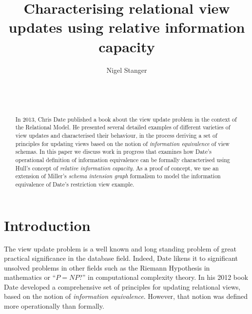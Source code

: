 \documentclass{sig-alternate-05-2015}
\begin{document}

\title{Characterising relational view updates using relative information capacity}

\author{
\alignauthor Nigel Stanger \\
    \\
    \\
    \\
}

\maketitle




\begin{abstract}
In 2013, Chris Date published a book about the view update problem in the context of the Relational Model. He presented several detailed examples of different varieties of view updates and characterised their behaviour, in the process deriving a set of principles for updating views based on the notion of \emph{information equivalence} of view schemas. In this paper we discuss work in progress that examines how Date's operational definition of information equivalence can be formally characterised using Hull's concept of \emph{relative information capacity}. As a proof of concept, we use an extension of Miller's \emph{schema intension graph} formalism to model the information equivalence of Date's restriction view example.
\end{abstract}




\section{Introduction}

\noindent The view update problem is a well known and long standing problem of great practical significance in the database field. Indeed, Date \cite{Date.C-2013a-View} likens it to significant unsolved problems in other fields such as the Riemann Hypothesis in mathematics or ``\(P = \mathit{NP}\)?'' in computational complexity theory. In his 2012 book \cite{Date.C-2013a-View} Date developed a comprehensive set of principles for updating relational views, based on the notion of \emph{information equivalence}. However, that notion was defined more operationally than formally.
\end{document}
